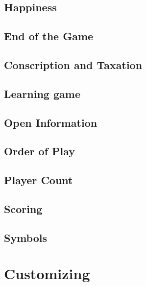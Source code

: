 \documentclass[12pt,a4paper,twocolumn,titlepage]{article}
\begin{document}
\subsection{Happiness}
\label{sec:happiness}


\subsection{End of the Game}
\label{sec:endgame}


\subsection{Conscription and Taxation}
\label{sec:anytime}


\subsection{Learning game}
\label{sec:learning}


\subsection{Open Information}
\label{sec:information}


\subsection{Order of Play}
\label{sec:order}


\subsection{Player Count}
\label{sec:playercount}


\subsection{Scoring}
\label{sec:scoring}


\subsection{Symbols}
\label{sec:symbols}

% 

\section{Customizing}
\label{sec:customizing}

\end{document}
